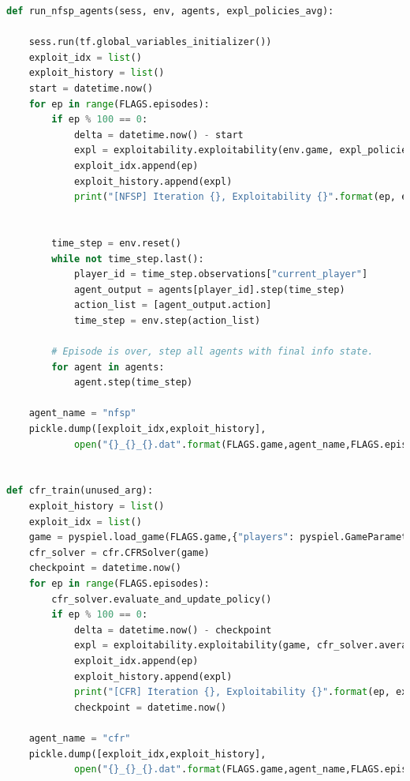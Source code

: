 \documentclass[10pt,a4paper]{article}
\begin{document}
\begin{lstlisting}[language=Python]
def run_nfsp_agents(sess, env, agents, expl_policies_avg):
    
    sess.run(tf.global_variables_initializer())
    exploit_idx = list()
    exploit_history = list()
    start = datetime.now()
    for ep in range(FLAGS.episodes):
        if ep % 100 == 0:
            delta = datetime.now() - start
            expl = exploitability.exploitability(env.game, expl_policies_avg)
            exploit_idx.append(ep)
            exploit_history.append(expl)
            print("[NFSP] Iteration {}, Exploitability {}".format(ep, expl))


        time_step = env.reset()
        while not time_step.last():
            player_id = time_step.observations["current_player"]
            agent_output = agents[player_id].step(time_step)
            action_list = [agent_output.action]
            time_step = env.step(action_list)

        # Episode is over, step all agents with final info state.
        for agent in agents:
            agent.step(time_step)

    agent_name = "nfsp"
    pickle.dump([exploit_idx,exploit_history],
            open("{}_{}_{}.dat".format(FLAGS.game,agent_name,FLAGS.episodes),"wb"))

    
def cfr_train(unused_arg):
    exploit_history = list()
    exploit_idx = list()
    game = pyspiel.load_game(FLAGS.game,{"players": pyspiel.GameParameter(2)})
    cfr_solver = cfr.CFRSolver(game)
    checkpoint = datetime.now()
    for ep in range(FLAGS.episodes):
        cfr_solver.evaluate_and_update_policy()
        if ep % 100 == 0:
            delta = datetime.now() - checkpoint
            expl = exploitability.exploitability(game, cfr_solver.average_policy())
            exploit_idx.append(ep)
            exploit_history.append(expl)
            print("[CFR] Iteration {}, Exploitability {}".format(ep, expl))
            checkpoint = datetime.now()
    
    agent_name = "cfr"
    pickle.dump([exploit_idx,exploit_history],
            open("{}_{}_{}.dat".format(FLAGS.game,agent_name,FLAGS.episodes),"wb"))

\end{lstlisting}
\newpage
\end{document}
